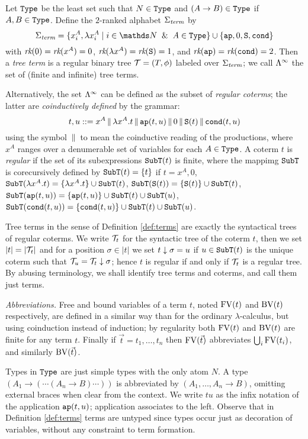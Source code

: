 \begin{definition}\label{def:terms}
Let ${\tt Type}$ be the least
set such that $N \in {\tt Type}$ and $(A \to B) \in {\tt Type}$ if $A,B \in {\tt Type}$.
Define the $2$-ranked alphabet $\Sigma_{\textit{term}}$ by
\[\SigmaTerm = \set{x_i^A, \lambda x_i^A \mid i \in \nat \And A\in \Type} \cup \set{\ap, 0, \Succ, \cond}\]
with $\textit{rk}(0) = \textit{rk}(x^A) = 0$, $\textit{rk}( \lambda x^A) = \textit{rk}({\tt S}) = 1$, and
$\textit{rk}({\tt ap}) = \textit{rk}({\tt cond}) = 2$.
Then a {\em tree term} is a regular binary tree ${\cal T} = (T, \phi)$ labeled over $\Sigma_{\textit{term}}$; we
call $\Lambda^\infty$ the set of (finite and infinite) tree terms.
\end{definition}

\medskip

Alternatively, the set $\Lambda^\infty$ can be defined as the subset of {\em regular coterms}; the latter are
{\em coinductively defined} by the grammar:
\[ t, u ::= x^A \,\|\, \lambda x^A.t \,\|\, {\tt ap}(t,u) \,\|\, 0 \,\|\, {\tt S} (t) \,\|\, {\tt cond}(t, u) \]
using the symbol $\,\|\,$ to mean the coinductive reading of the productions,
where $x^A$ ranges over a denumerable set of variables for each $A \in {\tt Type}$.
A coterm $t$ is {\em regular} if the set of its subexpressions ${\tt SubT}(t)$ is finite,
where the mappimg ${\tt SubT}$ is corecursively defined by ${\tt SubT}(t) = \{ t \}$ if $t = x^A, 0$, 
${\tt SubT}(\lambda x^A.t) = \{ \lambda x^A.t \} \cup {\tt SubT}(t)$, 
${\tt SubT}({\tt S}(t)) = \{ {\tt S}(t) \} \cup {\tt SubT}(t)$,
${\tt SubT}({\tt ap}(t,u)) = \{ {\tt ap}(t,u) \} \cup {\tt SubT}(t) \cup {\tt SubT}(u)$,
${\tt SubT}({\tt cond}(t,u)) = \{ {\tt cond}(t,u) \} \cup {\tt SubT}(t) \cup {\tt SubT}(u)$.

Tree terms in the sense of Definition \ref{def:terms} are exactly the syntactical trees of regular coterms. 
We write ${\cal T}_t$ for the syntactic tree of the coterm $t$, then we set $|t| = |{\cal T}_t|$ and for
a position $\sigma \in |t|$ we set $t \downarrow \sigma = u$ if $u \in {\tt SubT}(t)$ is the unique 
coterm such that ${\cal T}_u = {\cal T}_t \downarrow \sigma$; hence $t$ is regular if and only if ${\cal T}_t$
is a regular tree. By abusing terminology, we shall 
identify tree terms and coterms, and call them just terms.

\medskip
{\em Abbreviations.} 
Free and bound variables of a term $t$, noted ${{\rm FV}}(t)$ and ${{\rm BV}}(t)$ respectively, are defined in a similar 
way than for the ordinary $\lambda$-calculus, but using coinduction instead of induction; by regularity both 
${{\rm FV}}(t)$ and ${{\rm BV}}(t)$ are finite for any term $t$. Finally if $\vec{t} = t_1, \ldots , t_n$ then ${{\rm FV}}(\vec{t})$ abbreviates
$\bigcup_i {{\rm FV}}(t_i)$, and similarly ${{\rm BV}}(\vec{t})$.

Types in ${\tt Type}$ are just simple types with the only atom $N$.
A type $(A_1 \to (\cdots (A_n \to B) \cdots))$ is abbreviated by $(A_1, \ldots, A_n \to B)$,
omitting external braces when clear from the context.
We write $tu$ as the infix notation of the application ${\tt ap}(t,u)$; application associates to the left.
Observe that in Definition \ref{def:terms} terms are untyped since types occur just as decoration of variables, without any constraint
to term formation.

